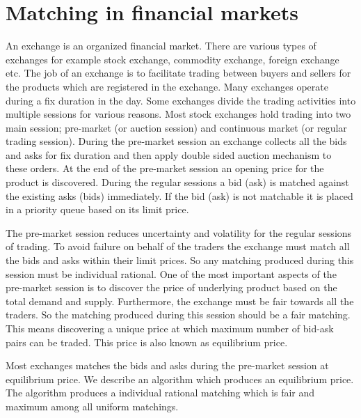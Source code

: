 \documentclass[a4paper,UKenglish,cleveref, autoref]{lipics-v2019}
\begin{document}
\begin{theorem}
\end{theorem}


\section{Matching in financial markets}\label{sec:matchingInMarkets} 
An exchange is an organized financial market. There are various types of exchanges for example stock exchange, commodity exchange, foreign exchange etc. The job of an exchange is to facilitate trading between buyers and sellers for the products which are registered in the exchange. Many exchanges operate during a fix duration in the day. Some exchanges divide the trading activities into multiple sessions for various reasons. Most stock exchanges hold trading into two main session; pre-market (or auction session) and continuous  market (or regular trading session). During the pre-market session an exchange collects all the bids and asks for fix duration and then apply double sided auction mechanism to these orders. At the end of the pre-market session an opening price for the product is discovered. During the regular sessions a bid (ask) is matched against the existing asks (bids) immediately. If the bid (ask) is not matchable it is placed in a priority queue based on its limit price. 

The pre-market session reduces uncertainty and volatility for the regular sessions of trading. To avoid failure on behalf of the traders the exchange must match all the bids and asks within their limit prices. So any matching produced during this session must be individual rational. One of the most important aspects of the pre-market session is to discover the price of underlying product based on the total demand and supply. Furthermore, the exchange must be fair towards all the traders. So the matching produced during this session should be a fair matching.  This means discovering  a unique price at which maximum number of  bid-ask pairs can be traded. This price is also known as equilibrium price. 

Most exchanges matches the bids and asks during the pre-market session at equilibrium price.   We describe an algorithm which produces an equilibrium price. The algorithm  produces a individual rational matching which is fair and maximum among all uniform matchings.
\end{document}
